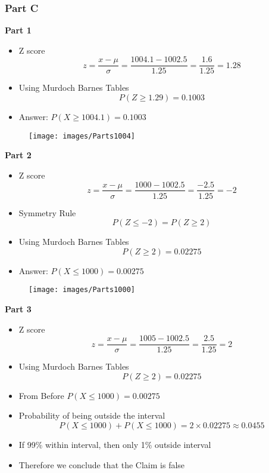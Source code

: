\documentclass[a4paper,12pt]{article}
\begin{document}
\subsubsection*{Part C}
\noindent \textbf{Part 1}
\begin{itemize}
	
	\item Z score
	\[  z = \frac{x-\mu}{\sigma} = \frac{1004.1-1002.5}{1.25} = \frac{1.6}{1.25} = 1.28\]
	
	\item Using Murdoch Barnes Tables
	\[ P(Z \geq 1.29) = 0.1003\]
	
	\item Answer: $P(X \geq 1004.1) =0.1003$
	
\end{itemize}
\begin{figure}[h!]
	\centering
	\texttt{[image: images/Parts1004]}
	
\end{figure}
\newpage
\noindent \textbf{Part 2}
\begin{itemize}
	
	\item Z score
	\[  z = \frac{x-\mu}{\sigma} = \frac{1000-1002.5}{1.25} = \frac{-2.5}{1.25} = -2\]
	
	\item Symmetry Rule
	\[ P(Z \leq -2) = P(Z \geq 2) \]
	\item Using Murdoch Barnes Tables
	\[ P(Z \geq 2) = 0.02275\]
	
	\item Answer: $P(X \leq 1000) =0.00275$
	
\end{itemize}
\begin{figure}[h!]
	\centering
	\texttt{[image: images/Parts1000]}
	
\end{figure}
\noindent \textbf{Part 3}

\begin{itemize}
	
	\item Z score
	\[  z = \frac{x-\mu}{\sigma} = \frac{1005-1002.5}{1.25} = \frac{2.5}{1.25} = 2\]
	
	
	\item Using Murdoch Barnes Tables
	\[ P(Z \geq 2) = 0.02275\]
	
	
	\item From Before $P(X \leq 1000) =0.00275$
	\item Probability of being outside the interval 
	\[P(X \leq 1000) + P(X \leq 1000)  = 2 \times 0.02275 \approx 0.0455\]
	\item If 99\% within interval, then only 1\% outside interval
	\item Therefore we conclude that the Claim is false
\end{itemize}
\end{document}
